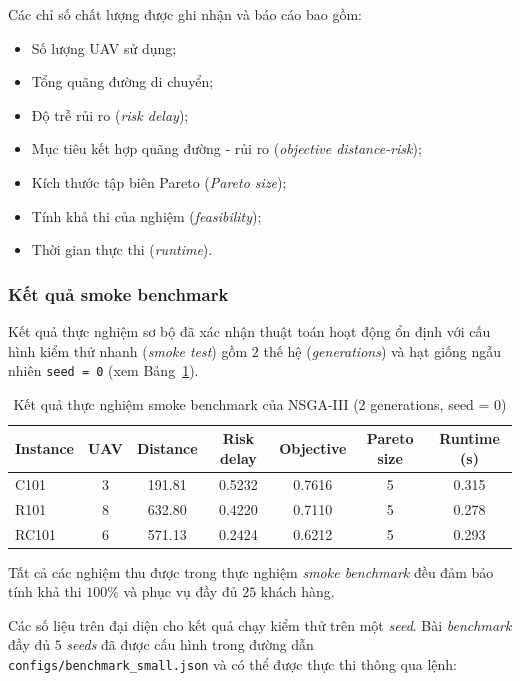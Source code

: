 \documentclass{article}
\begin{document}
Các chỉ số chất lượng được ghi nhận và báo cáo bao gồm:
\begin{itemize}
    \item Số lượng UAV sử dụng;
    \item Tổng quãng đường di chuyển;
    \item Độ trễ rủi ro (\textit{risk delay});
    \item Mục tiêu kết hợp quãng đường - rủi ro (\textit{objective distance-risk});
    \item Kích thước tập biên Pareto (\textit{Pareto size});
    \item Tính khả thi của nghiệm (\textit{feasibility});
    \item Thời gian thực thi (\textit{runtime}).
\end{itemize}

\subsubsection{Kết quả smoke benchmark}

Kết quả thực nghiệm sơ bộ đã xác nhận thuật toán hoạt động ổn định với cấu hình kiểm thử nhanh (\textit{smoke test}) gồm $2$ thế hệ (\textit{generations}) và hạt giống ngẫu nhiên \texttt{seed = 0} (xem Bảng~\ref{tab:smoke_benchmark}).

\begin{table}[htbp]
    \centering
    \caption{Kết quả thực nghiệm smoke benchmark của NSGA-III (2 generations, seed = 0)}
    \label{tab:smoke_benchmark}
    \begin{tabular}{|l|c|c|c|c|c|c|}
        \hline
        \textbf{Instance} & \textbf{UAV} & \textbf{Distance} & \textbf{Risk delay} & \textbf{Objective} & \textbf{Pareto size} & \textbf{Runtime (s)} \\ \hline
        C101 & 3 & 191.81 & 0.5232 & 0.7616 & 5 & 0.315 \\ \hline
        R101 & 8 & 632.80 & 0.4220 & 0.7110 & 5 & 0.278 \\ \hline
        RC101 & 6 & 571.13 & 0.2424 & 0.6212 & 5 & 0.293 \\ \hline
    \end{tabular}
\end{table}

Tất cả các nghiệm thu được trong thực nghiệm \textit{smoke benchmark} đều đảm bảo tính khả thi $100\%$ và phục vụ đầy đủ $25$ khách hàng.

Các số liệu trên đại diện cho kết quả chạy kiểm thử trên một \textit{seed}. Bài \textit{benchmark} đầy đủ $5$ \textit{seeds} đã được cấu hình trong đường dẫn \texttt{configs/benchmark\_small.json} và có thể được thực thi thông qua lệnh:
\end{document}
